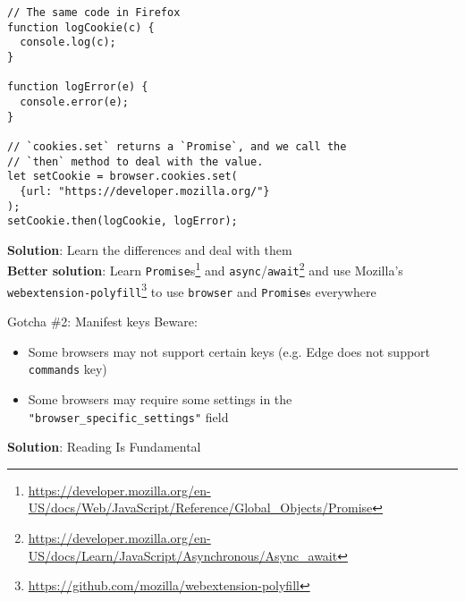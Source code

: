 \documentclass[../index.tex]{subfiles}
\begin{document}
\begin{frame}[fragile]{\currenttitle}
  \begin{lstlisting}[language=ES6]
// The same code in Firefox
function logCookie(c) {
  console.log(c);
}

function logError(e) {
  console.error(e);
}

// `cookies.set` returns a `Promise`, and we call the
// `then` method to deal with the value.
let setCookie = browser.cookies.set(
  {url: "https://developer.mozilla.org/"}
);
setCookie.then(logCookie, logError);
  \end{lstlisting}
\end{frame}

\newcommand{\promisesfootnote}{\footnote{\url{https://developer.mozilla.org/en-US/docs/Web/JavaScript/Reference/Global_Objects/Promise}}}
\newcommand{\asyncfootnote}{\footnote{\url{https://developer.mozilla.org/en-US/docs/Learn/JavaScript/Asynchronous/Async_await}}}
\newcommand{\polyfillfootnote}{\footnote{\url{https://github.com/mozilla/webextension-polyfill}}}
\begin{frame}[fragile]{\currenttitle}
  \textbf{Solution}: Learn the differences and deal with them \\[1em]

  \textbf{Better solution}: Learn \texttt{Promise}s\promisesfootnote{}
  and \texttt{async}/\texttt{await}\asyncfootnote{}
  and use Mozilla's \texttt{webextension-polyfill}\polyfillfootnote{}
  to use \texttt{browser} and \texttt{Promise}s everywhere
\end{frame}

\renewcommand{\currenttitle}{Gotcha \#2: Manifest keys}
\begin{frame}[fragile]{\currenttitle}
  Beware:
  \begin{itemize}
    \item Some browsers may not support certain keys\footnotemark{} (e.g. Edge does not
          support \texttt{commands} key)
    \item Some browsers may require some settings in the \texttt{"browser\_specific\_settings"} field
  \end{itemize}

  \vspace*{1em}
  \textbf{Solution}: Reading Is Fundamental
\end{frame}
\end{document}
